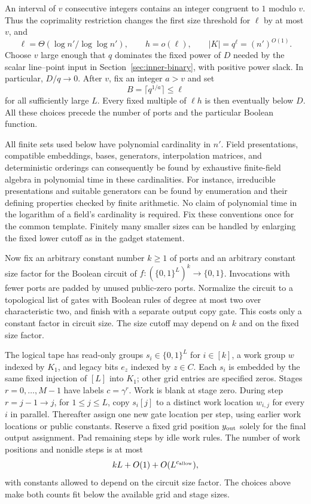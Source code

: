 An interval of $v$ consecutive integers contains an integer congruent to
$1$ modulo $v$.  Thus the coprimality restriction changes the first size
threshold for $\ell$ by at most $v$, and
\begin{equation}
 \ell=\Theta(\log n'/\log\log n'),\qquad
 h=o(\ell),\qquad |K|=q^\ell=(n')^{O(1)}.          \label{ia:size-bounds}
\end{equation}
Choose $v$ large enough that $q$ dominates the fixed power of $D$ needed
by the scalar line--point input in Section~\ref{sec:inner-binary}, with
positive power slack.  In particular, $D/q\longrightarrow0$.  After $v$,
fix an integer $a>v$ and set
\begin{equation}
 B=\lceil q^{1/a}\rceil\le\ell                     \label{ia:radix-size}
\end{equation}
for all sufficiently large $L$.  Every fixed multiple of $\ell h$ is then
eventually below $D$.  All these choices precede the number of ports and
the particular Boolean function.

All finite sets used below have polynomial cardinality in $n'$.  Field
presentations, compatible embeddings, bases, generators, interpolation
matrices, and deterministic orderings can consequently be found by
exhaustive finite-field algebra in polynomial time in these cardinalities.
For instance, irreducible presentations and suitable generators can be
found by enumeration and their defining properties checked by finite
arithmetic.  No claim of polynomial time in the logarithm of a field's
cardinality is required.  Fix these conventions once for the common
template.  Finitely many smaller sizes can be handled by enlarging the
fixed lower cutoff as in the gadget statement.

Now fix an arbitrary constant number $k\ge1$ of ports and an arbitrary
constant size factor for the Boolean circuit of
$f:(\{0,1\}^L)^k\to\{0,1\}$.  Invocations with fewer ports are padded
by unused public-zero ports.  Normalize the circuit to a topological list
of gates with Boolean rules of degree at most two over characteristic two,
and finish with a separate output copy gate.  This costs only a constant
factor in circuit size.  The size cutoff may depend on $k$ and on the
fixed size factor.

The logical tape has read-only groups $s_i\in\{0,1\}^L$ for $i\in[k]$,
a work group $w$ indexed by $K_1$, and legacy bits $e_z$ indexed by
$z\in C$.  Each $s_i$ is embedded by the same fixed injection of $[L]$
into $K_1$; other grid entries are specified zeros.  Stages
$r=0,\ldots,M-1$ have labels $c=\gamma^r$.  Work is blank at stage zero.
During step $r=j-1\to j$, for $1\le j\le L$, copy $s_i[j]$ to a
distinct work location $w_{i,j}$ for every $i$ in parallel.  Thereafter
assign one new gate location per step, using earlier work locations or
public constants.  Reserve a fixed grid position $y_{\rm out}$ solely
for the final output assignment.  Pad remaining steps by idle work rules.
The number of work positions and nonidle steps is at most
\[
 kL+O(1)+O(L^{c_{\rm allow}}),
\]
with constants allowed to depend on the circuit size factor.  The choices
above make both counts fit below the available grid and stage sizes.


